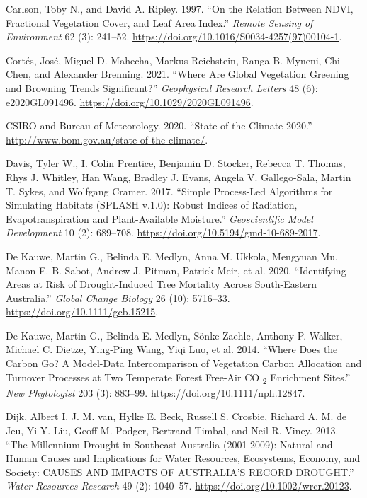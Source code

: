 \documentclass[
]{article}
\newlength{\cslhangindent}
\newlength{\cslentryspacingunit} %
\newenvironment{CSLReferences}[2] %
 {%
  \setlength{\parindent}{0pt}
  \ifodd #1
  \let\oldpar\par
  \def\par{\hangindent=\cslhangindent\oldpar}
  \fi
  \setlength{\parskip}{#2\cslentryspacingunit}
 }%
 {}
\begin{document}
\begin{CSLReferences}{1}{0}
\leavevmode{}%
Carlson, Toby N., and David A. Ripley. 1997. {``On the Relation Between
{NDVI}, Fractional Vegetation Cover, and Leaf Area Index.''}
\emph{Remote Sensing of Environment} 62 (3): 241--52.
\url{https://doi.org/10.1016/S0034-4257(97)00104-1}.

\leavevmode{}%
Cortés, José, Miguel D. Mahecha, Markus Reichstein, Ranga B. Myneni, Chi
Chen, and Alexander Brenning. 2021. {``Where {Are Global Vegetation
Greening} and {Browning Trends Significant}?''} \emph{Geophysical
Research Letters} 48 (6): e2020GL091496.
\url{https://doi.org/10.1029/2020GL091496}.

\leavevmode{}%
CSIRO and Bureau of Meteorology. 2020. {``State of the {Climate}
2020.''} \url{http://www.bom.gov.au/state-of-the-climate/}.

\leavevmode{}%
Davis, Tyler W., I. Colin Prentice, Benjamin D. Stocker, Rebecca T.
Thomas, Rhys J. Whitley, Han Wang, Bradley J. Evans, Angela V.
Gallego-Sala, Martin T. Sykes, and Wolfgang Cramer. 2017. {``Simple
Process-Led Algorithms for Simulating Habitats ({SPLASH} v.1.0): Robust
Indices of Radiation, Evapotranspiration and Plant-Available
Moisture.''} \emph{Geoscientific Model Development} 10 (2): 689--708.
\url{https://doi.org/10.5194/gmd-10-689-2017}.

\leavevmode{}%
De Kauwe, Martin G., Belinda E. Medlyn, Anna M. Ukkola, Mengyuan Mu,
Manon E. B. Sabot, Andrew J. Pitman, Patrick Meir, et al. 2020.
{``Identifying Areas at Risk of Drought-Induced Tree Mortality Across
{South}-{Eastern Australia}.''} \emph{Global Change Biology} 26 (10):
5716--33. \url{https://doi.org/10.1111/gcb.15215}.

\leavevmode{}%
De Kauwe, Martin G., Belinda E. Medlyn, Sönke Zaehle, Anthony P. Walker,
Michael C. Dietze, Ying-Ping Wang, Yiqi Luo, et al. 2014. {``Where Does
the Carbon Go? {A} Model-Data Intercomparison of Vegetation Carbon
Allocation and Turnover Processes at Two Temperate Forest Free-Air {CO}
{\textsubscript{2}} Enrichment Sites.''} \emph{New Phytologist} 203 (3):
883--99. \url{https://doi.org/10.1111/nph.12847}.

\leavevmode{}%
Dijk, Albert I. J. M. van, Hylke E. Beck, Russell S. Crosbie, Richard A.
M. de Jeu, Yi Y. Liu, Geoff M. Podger, Bertrand Timbal, and Neil R.
Viney. 2013. {``The {Millennium Drought} in Southeast {Australia}
(2001-2009): {Natural} and Human Causes and Implications for Water
Resources, Ecosystems, Economy, and Society: {CAUSES AND IMPACTS OF
AUSTRALIA}'{S RECORD DROUGHT}.''} \emph{Water Resources Research} 49
(2): 1040--57. \url{https://doi.org/10.1002/wrcr.20123}.


\end{CSLReferences}
\end{document}
